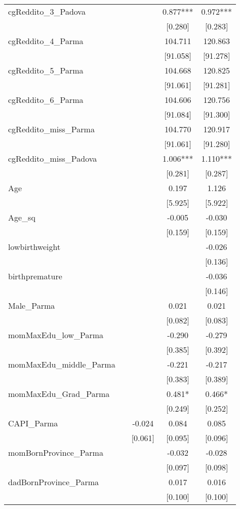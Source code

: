 \documentclass[]{article}
\begin{document}
\begin{tabular}{lcccc}
cgReddito\_3\_Padova &  &  & 0.877*** & 0.972*** \\
 &  &  & [0.280] & [0.283] \\
cgReddito\_4\_Parma &  &  & 104.711 & 120.863 \\
 &  &  & [91.058] & [91.278] \\
cgReddito\_5\_Parma &  &  & 104.668 & 120.825 \\
 &  &  & [91.061] & [91.281] \\
cgReddito\_6\_Parma &  &  & 104.606 & 120.756 \\
 &  &  & [91.084] & [91.300] \\
cgReddito\_miss\_Parma &  &  & 104.770 & 120.917 \\
 &  &  & [91.061] & [91.280] \\
cgReddito\_miss\_Padova &  &  & 1.006*** & 1.110*** \\
 &  &  & [0.281] & [0.287] \\
Age &  &  & 0.197 & 1.126 \\
 &  &  & [5.925] & [5.922] \\
Age\_sq &  &  & -0.005 & -0.030 \\
 &  &  & [0.159] & [0.159] \\
lowbirthweight &  &  &  & -0.026 \\
 &  &  &  & [0.136] \\
birthpremature &  &  &  & -0.036 \\
 &  &  &  & [0.146] \\
Male\_Parma &  &  & 0.021 & 0.021 \\
 &  &  & [0.082] & [0.083] \\
momMaxEdu\_low\_Parma &  &  & -0.290 & -0.279 \\
 &  &  & [0.385] & [0.392] \\
momMaxEdu\_middle\_Parma &  &  & -0.221 & -0.217 \\
 &  &  & [0.383] & [0.389] \\
momMaxEdu\_Grad\_Parma &  &  & 0.481* & 0.466* \\
 &  &  & [0.249] & [0.252] \\
CAPI\_Parma &  & -0.024 & 0.084 & 0.085 \\
 &  & [0.061] & [0.095] & [0.096] \\
momBornProvince\_Parma &  &  & -0.032 & -0.028 \\
 &  &  & [0.097] & [0.098] \\
dadBornProvince\_Parma &  &  & 0.017 & 0.016 \\
 &  &  & [0.100] & [0.100] \\

\end{tabular}
\end{document}
